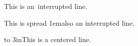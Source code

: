 This is \hbox{an interrupted} line.\par
This is \hbox spread 1em{also an interrupted} line.\par
\hbox to 3in{\vrule\hfil This is a centered line.\hfil\vrule}\par
\bye
